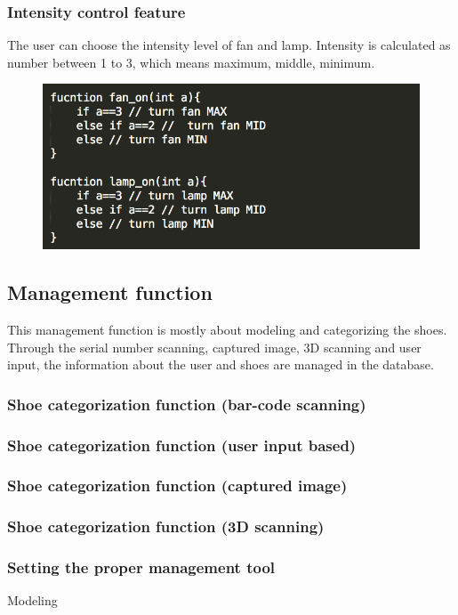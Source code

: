 \documentclass[conference]{IEEEtran}
\begin{document}
\subsubsection{Intensity control feature}
The user can choose the intensity level of fan and lamp. Intensity is calculated as number between 1 to 3, which means maximum, middle, minimum.
\begin{figure}[H]
\begin{center}
    \includegraphics[scale=0.6]{optimization6}
    \label{fig:label}
\end{center}
\end{figure}
\subsection{Management function}
This management function is mostly about modeling and categorizing the shoes. Through the serial number scanning, captured image, 3D scanning and user input, the information about the user and shoes are managed in the database. 
\subsubsection{Shoe categorization function (bar-code scanning)}
\subsubsection{Shoe categorization function (user input based)}
\subsubsection{Shoe categorization function (captured image)}
\subsubsection{Shoe categorization function (3D scanning)}
\subsubsection{Setting the proper management tool}Modeling
\end{document}
